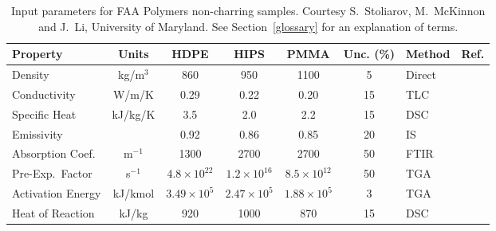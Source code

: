 \begin{table}[h!]
\caption[FAA non-charring polymer properties.]{Input parameters for FAA Polymers non-charring samples. Courtesy S.~Stoliarov, M.~McKinnon and J.~Li, University of Maryland.
See Section~\ref{glossary} for an explanation of terms.}
\begin{center}
\begin{tabular}{|l|c|c|c|c|c|l|l|}
\hline
Property                    & Units         & HDPE                  & HIPS                  & PMMA                  & Unc. (\%) & Method                &  Ref.                         \\ \hline \hline
Density                     & kg/m$^3$      & 860                   & 950                   & 1100                  & 5         & Direct                &  \cite{Stoliarov:CF2009}      \\ \hline
Conductivity                & W/m/K         & 0.29                  & 0.22                  & 0.20                  & 15        & TLC                   &  \cite{Stoliarov:CF2009}      \\ \hline
Specific Heat               & kJ/kg/K       & 3.5                   & 2.0                   & 2.2                   & 15        & DSC                   &  \cite{Stoliarov:PDS2008}     \\ \hline
Emissivity                  &               & 0.92                  & 0.86                  & 0.85                  & 20        & IS                    &  \cite{Hallman:PES1974}       \\ \hline
Absorption Coef.            & m$^{-1}$      & 1300                  & 2700                  & 2700                  & 50        & FTIR                  &  \cite{Tsilingiris:ECM2003}   \\ \hline
Pre-Exp.~Factor             & s$^{-1}$      & $4.8 \times 10^{22}$  & $1.2 \times 10^{16}$  & $8.5 \times 10^{12}$  & 50        & TGA                   &  \cite{Stoliarov:CF2009}      \\ \hline
Activation Energy           & kJ/kmol       & $3.49 \times 10^{5}$  & $2.47 \times 10^{5}$  & $1.88 \times 10^{5}$  & 3         & TGA                   &  \cite{Stoliarov:CF2009}      \\ \hline
Heat of Reaction            & kJ/kg         & 920                   & 1000                  & 870                   & 15        & DSC                   &  \cite{Stoliarov:PDS2008}     \\ \hline
\end{tabular}
\end{center}
\label{FAA_Properties}
\end{table}



